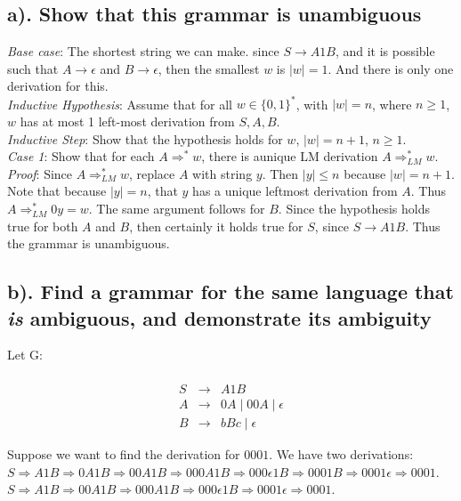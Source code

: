 \documentclass[20pt]{article} %
\begin{document}
\subsection{a). Show that this grammar is unambiguous}
\textit{Base case}: The shortest string we can make. since $S \rightarrow A1B$, and it is possible such that $A \rightarrow \epsilon$ and $ B \rightarrow \epsilon$, then the smallest $w$ is $|w| = 1$.  And there is only one derivation for this. \\
\textit{Inductive Hypothesis}:  Assume that for all $w \in \{0,1\}^{*}$, with $|w| = n$, where $n \geq 1$, $w$ has at most 1 left-most derivation from $S,A,B$. \\
\textit{Inductive Step}: Show that the hypothesis holds for $w$, $|w| = n+1$, $n \geq 1$. \\
\textit{Case 1}: Show that for each $A \Rightarrow^{*} w$, there is aunique LM derivation $A \Rightarrow_{LM}^{*} w$. \\
\textit{Proof}: Since $A \Rightarrow_{LM}^{*} w$, replace $A$ with string $y$. Then $|y| \leq n$ because $|w| = n+1$. Note that because $|y| = n$, that $y$ has a unique leftmost derivation from $A$.  Thus $A \Rightarrow_{LM}^{*} 0y = w$.  The same argument follows for $B$.  Since the hypothesis holds true for both $A$ and $B$, then certainly it holds true for $S$, since $S \rightarrow A1B$.  Thus the grammar is unambiguous.

\newpage
\subsection{b). Find a grammar for the same language that \textit{is} ambiguous, and demonstrate its ambiguity}
Let G:
 \begin{table}[!htbp]
 \[\begin{array}{ccc} 
&  \\
 S & \rightarrow & A1B \\
 A & \rightarrow & 0A \mid 00A \mid \epsilon \\
 B & \rightarrow & bBc \mid \epsilon
 \end{array}\]
 \end{table}

Suppose we want to find the derivation for $0001$. We have two derivations:\\
$ S \Rightarrow A1B \Rightarrow 0A1B \Rightarrow 00A1B \Rightarrow 000A1B \Rightarrow 000\epsilon 1B \Rightarrow 0001B \Rightarrow 0001\epsilon \Rightarrow 0001$. \\
$ S \Rightarrow A1B \Rightarrow 00A1B \Rightarrow 000A1B \Rightarrow 000\epsilon 1B \Rightarrow 0001\epsilon \Rightarrow 0001$. \\
\end{document}
